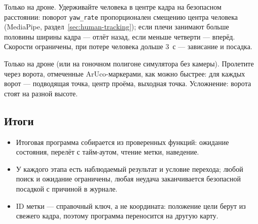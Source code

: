 \begin{taskbox}
Только на дроне. Удерживайте человека в центре кадра на безопасном расстоянии: поворот \verb|yaw_rate| пропорционален смещению центра человека (MediaPipe, раздел~\ref{sec:human-tracking}); если плечи занимают больше половины ширины кадра --- отлёт назад, если меньше четверти --- вперёд. Скорости ограничены, при потере человека дольше 3~с --- зависание и посадка.
\end{taskbox}

\begin{taskbox}
Только на дроне (или на гоночном полигоне симулятора без камеры). Пролетите через ворота, отмеченные ArUco-маркерами, как можно быстрее: для каждых ворот --- подводящая точка, центр проёма, выходная точка. Усложнение: ворота стоят на разной высоте.
\end{taskbox}

\subsection*{Итоги}
\begin{itemize}
    \item Итоговая программа собирается из проверенных функций: ожидание состояния, перелёт с тайм-аутом, чтение метки, наведение.
    \item У каждого этапа есть наблюдаемый результат и условие перехода; любой поиск и ожидание ограничены, любая неудача заканчивается безопасной посадкой с причиной в журнале.
    \item ID метки --- справочный ключ, а не координата: положение цели берут из свежего кадра, поэтому программа переносится на другую карту.
\end{itemize}
